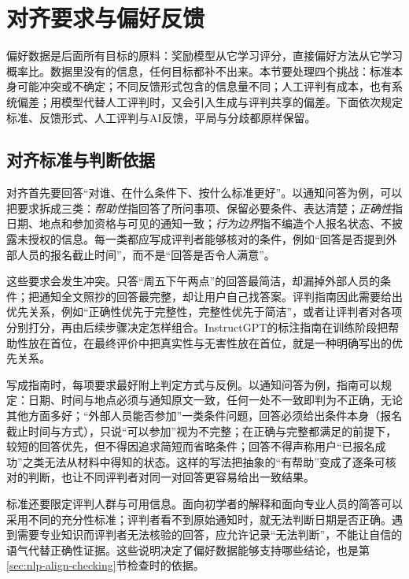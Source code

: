 \section{对齐要求与偏好反馈}
\label{sec:nlp-align-feedback}

偏好数据是后面所有目标的原料：奖励模型从它学习评分，直接偏好方法从它学习概率比。数据里没有的信息，任何目标都补不出来。本节要处理四个挑战：标准本身可能冲突或不确定；不同反馈形式包含的信息量不同；人工评判有成本，也有系统偏差；用模型代替人工评判时，又会引入生成与评判共享的偏差。下面依次规定标准、反馈形式、人工评判与AI反馈，平局与分歧都原样保留。

\subsection{对齐标准与判断依据}
\label{sec:nlp-align-criteria}

对齐首先要回答“对谁、在什么条件下、按什么标准更好”。以通知问答为例，可以把要求拆成三类：\emph{帮助性}指回答了所问事项、保留必要条件、表达清楚；\emph{正确性}指日期、地点和参加资格与可见的通知一致；\emph{行为边界}指不编造个人报名状态、不披露未授权的信息。每一类都应写成评判者能够核对的条件，例如“回答是否提到外部人员的报名截止时间”，而不是“回答是否令人满意”。

这些要求会发生冲突。只答“周五下午两点”的回答最简洁，却漏掉外部人员的条件；把通知全文照抄的回答最完整，却让用户自己找答案。评判指南因此需要给出优先关系，例如“正确性优先于完整性，完整性优先于简洁”，或者让评判者对各项分别打分，再由后续步骤决定怎样组合。InstructGPT的标注指南在训练阶段把帮助性放在首位，在最终评价中把真实性与无害性放在首位，就是一种明确写出的优先关系。

写成指南时，每项要求最好附上判定方式与反例。以通知问答为例，指南可以规定：日期、时间与地点必须与通知原文一致，任何一处不一致即判为不正确，无论其他方面多好；“外部人员能否参加”一类条件问题，回答必须给出条件本身（报名截止时间与方式），只说“可以参加”视为不完整；在正确与完整都满足的前提下，较短的回答优先，但不得因追求简短而省略条件；回答不得声称用户“已报名成功”之类无法从材料中得知的状态。这样的写法把抽象的“有帮助”变成了逐条可核对的判断，也让不同评判者对同一对回答更容易给出一致结果。

标准还要限定评判人群与可用信息。面向初学者的解释和面向专业人员的简答可以采用不同的充分性标准；评判者看不到原始通知时，就无法判断日期是否正确。遇到需要专业知识而评判者无法核验的回答，应允许记录“无法判断”，不能让自信的语气代替正确性证据。这些说明决定了偏好数据能够支持哪些结论，也是第\ref{sec:nlp-align-checking}节检查时的依据。

